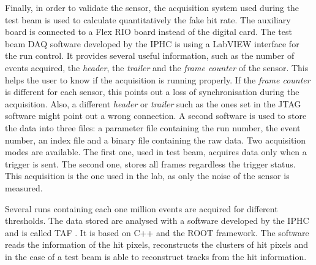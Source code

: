   Finally, in order to validate the sensor, the acquisition system used during the test beam is used to calculate quantitatively the fake hit rate.
  The auxiliary board is connected to a Flex RIO board instead of the digital card.
  The test beam \gls{DAQ} software developed by the \gls{IPHC} is using a LabVIEW interface for the run control.
  It provides several useful information, such as the number of events acquired, the \textit{header}, the \textit{trailer} and the \textit{frame counter} of the sensor.
  This helps the user to know if the acquisition is running properly.
  If the \textit{frame counter} is different for each sensor, this points out a loss of synchronisation during the acquisition.
  Also, a different \textit{header} or \textit{trailer} such as the ones set in the JTAG software might point out a wrong connection.
  A second software is used to store the data into three files: a parameter file containing the run number, the event number, an index file and a binary file containing the raw data.
  Two acquisition modes are available. 
  The first one, used in test beam, acquires data only when a trigger is sent.
  The second one, stores all frames regardless the trigger status. 
  This acquisition is the one used in the lab, as only the noise of the sensor is measured.
   
  Several runs containing each one million events are acquired for different thresholds. 
  The data stored are analysed with a software developed by the \gls{IPHC} and is called \gls{TAF} \cite{TAF2015}.
  It is based on C++ and the ROOT framework.
  The software reads the information of the hit pixels, reconstructs the clusters of hit pixels and in the case of a test beam is able to reconstruct tracks from the hit information.

